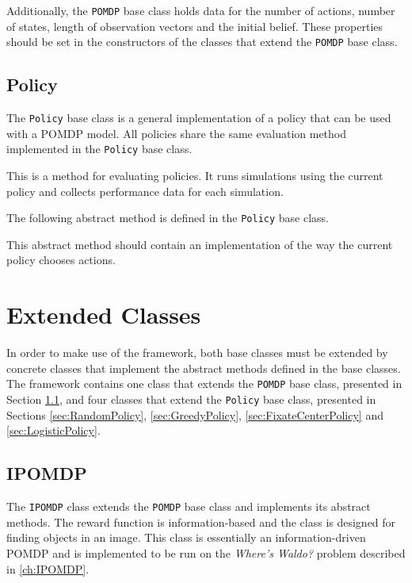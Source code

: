 Additionally, the \texttt{POMDP} base class holds data for the number of actions, number of states, length of observation vectors and the initial belief. These properties should be set in the constructors of the classes that extend the \texttt{POMDP} base class.

\subsection{Policy}
\label{sec:Policy}
The \texttt{Policy} base class is a general implementation of a policy that can be used with a POMDP model. All policies share the same evaluation method implemented in the \texttt{Policy} base class.
\begin{description} [style=nextline]
  \item[\texttt{Evaluate}]
  This is a method for evaluating policies. It runs simulations using the current policy and collects performance data for each simulation.
\end{description}
The following abstract method is defined in the \texttt{Policy} base class.

\begin{description} [style=nextline]
  \item[\texttt{GetAction}]
  This abstract method should contain an implementation of the way the current policy chooses actions.%
\end{description}

\section{Extended Classes}
\label{sec:ExtendedClasses}
In order to make use of the framework, both base classes must be extended by concrete classes that implement the abstract methods defined in the base classes. The framework contains one class that extends the \texttt{POMDP} base class, presented in Section \ref{sec:IPOMDP}, and four classes that extend the \texttt{Policy} base class, presented in Sections \ref{sec:RandomPolicy}, \ref{sec:GreedyPolicy}, \ref{sec:FixateCenterPolicy} and \ref{sec:LogisticPolicy}.

\subsection{IPOMDP}
\label{sec:IPOMDP}
The \texttt{IPOMDP} class extends the \texttt{POMDP} base class and implements its abstract methods. The reward function is information-based and the class is designed for finding objects in an image. This class is essentially an information-driven POMDP and is implemented to be run on the \emph{Where's Waldo?} problem described in \ref{ch:IPOMDP}.

